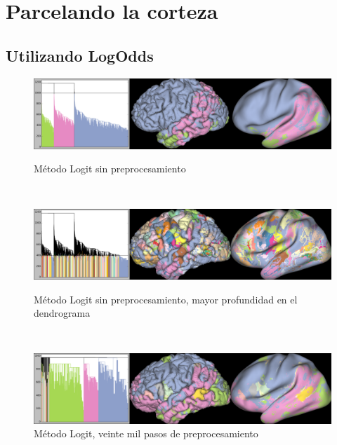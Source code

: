 \section{Parcelando la corteza}

\subsection{Utilizando LogOdds}

\begin{figure}[h!]
                                                                                                                        
\begin{minipage}[b]{\textwidth}
    \includegraphics[width=\textwidth]{img/all_brain/logit_0.png}
    \caption{M\'etodo Logit sin preprocesamiento}
    \label{fig:dmri}
\end{minipage} ~
                                                                                                                        
\begin{minipage}[b]{\textwidth}
    \includegraphics[width=\textwidth]{img/all_brain/logit_0_deep.png}
    \caption{M\'etodo Logit sin preprocesamiento, mayor profundidad en el 
            dendrograma}

\end{minipage} ~

\begin{minipage}[b]{\textwidth}
    \includegraphics[width=\textwidth]{img/all_brain/logit_20000.png}
    \caption{M\'etodo Logit, veinte mil pasos de preprocesamiento}


\end{minipage}
\end{figure}
